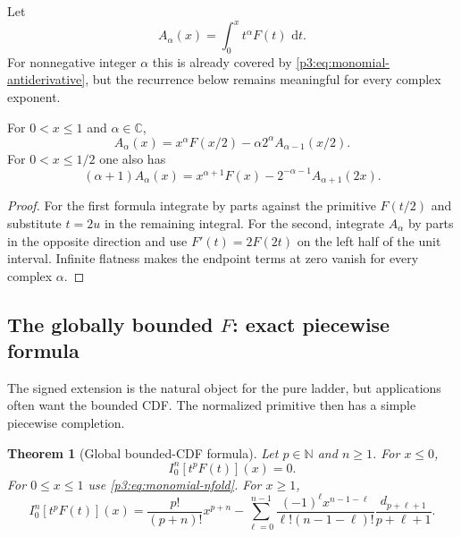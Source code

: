 \documentclass[11pt,oneside]{article}
\newtheorem{theorem}{Theorem}[section]
\theoremstyle{definition}
\theoremstyle{remark}
\newcommand{\C}{\mathbb C}
\newcommand{\N}{\mathbb N}
\newcommand{\dd}{\,\mathrm d}
\newcommand{\1}{\mathbf 1}
\begin{document}
Let
\begin{equation}
 A_\alpha(x)=\int_0^x t^\alpha F(t)\,\dd t.                   \label{p3:eq:Aalpha}
\end{equation}
For nonnegative integer $\alpha$ this is already covered by
\eqref{p3:eq:monomial-antiderivative}, but the recurrence below remains meaningful for every
complex exponent.

\begin{proposition}
\label{p3:prop:A-recurrence}
For $0<x\le1$ and $\alpha\in\C$,
\begin{equation}
 A_\alpha(x)=x^\alpha F(x/2)-\alpha2^\alpha A_{\alpha-1}(x/2).
 \label{p3:eq:A-recurrence}
\end{equation}
For $0<x\le1/2$ one also has
\begin{equation}
 (\alpha+1)A_\alpha(x)
 =x^{\alpha+1}F(x)-2^{-\alpha-1}A_{\alpha+1}(2x).
 \label{p3:eq:A-functional-recurrence}
\end{equation}
\end{proposition}

\begin{proof}
For the first formula integrate by parts against the primitive $F(t/2)$ and substitute
$t=2u$ in the remaining integral.  For the second, integrate
$A_\alpha$ by parts in the opposite direction and use $F'(t)=2F(2t)$ on the left half of the
unit interval.  Infinite flatness makes the endpoint terms at zero vanish for every complex
$\alpha$.
\end{proof}

\subsection{The globally bounded \texorpdfstring{$F$}{F}: exact piecewise formula}

The signed extension is the natural object for the pure ladder, but applications often want
the bounded CDF.  The normalized primitive then has a simple piecewise completion.

\begin{theorem}[Global bounded-CDF formula]
\label{p3:thm:global-bounded}
Let $p\in\N$ and $n\ge1$.  For $x\le0$,
\begin{equation}
 I_0^n[t^pF(t)](x)=0.                                        \label{p3:eq:global-left}
\end{equation}
For $0\le x\le1$ use \eqref{p3:eq:monomial-nfold}.  For $x\ge1$,
\begin{equation}
 \boxed{
 I_0^n[t^pF(t)](x)
 =\frac{p!}{(p+n)!}x^{p+n}
 -\sum_{\ell=0}^{n-1}
 \frac{(-1)^\ell x^{n-1-\ell}}{\ell!(n-1-\ell)!}
 \frac{d_{p+\ell+1}}{p+\ell+1}.}
 \label{p3:eq:global-right}
\end{equation}
\end{theorem}
\end{document}
